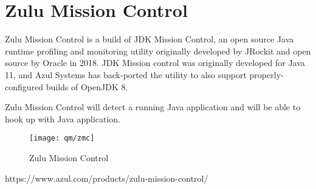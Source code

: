\section{Zulu Mission Control}
Zulu Mission Control is a build of JDK Mission Control,
an open source Java runtime profiling and monitoring utility
originally developed by JRockit and open source by Oracle in 2018.
JDK Mission control was originally developed for Java 11,
and Azul Systems has back-ported the utility to also support
properly-configured builds of OpenJDK 8.

\vspace{3mm}

Zulu Mission Control will detect a running Java application and
will be able to hook up with Java application.

\begin{figure}[H]
  \centering
  \texttt{[image: qm/zmc]}
  \caption{Zulu Mission Control}
\end{figure}

https://www.azul.com/products/zulu-mission-control/


